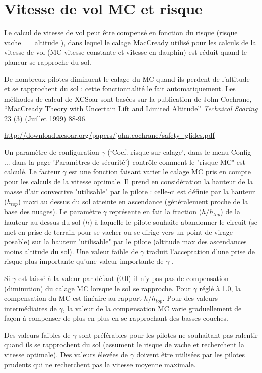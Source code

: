 \section{Vitesse de vol MC et risque}\label{sec:speed-fly-with}
Le calcul de vitesse de vol peut être compensé en fonction du risque (risque ~= vache  ~= altitude ), dans lequel le calage MacCready utilisé pour les calculs de la vitesse de vol (MC vitesse constante et vitesse en dauphin) est réduit quand le planeur se rapproche du sol.

De nombreux pilotes diminuent le calage du MC quand ils perdent de l'altitude et se rapprochent du sol : cette fonctionnalité le fait automatiquement. Les méthodes de calcul de XCSoar sont basées sur la publication de John  Cochrane, ``MacCready Theory with Uncertain Lift and Limited  Altitude'' {\em Technical Soaring} 23 (3) (Juillet 1999) 88-96.

\url{http://download.xcsoar.org/papers/john.cochrane/safety_glides.pdf}

Un paramètre de configuration $\gamma$ (`Coef. risque sur calage', dans le menu Config ... dans la page 'Paramètres de sécurité')  contrôle comment le "risque MC" est calculé. Le facteur $\gamma$ est une fonction faisant varier le calage MC pris en compte pour les calculs de la vitesse optimale. Il prend en considération la hauteur de la masse d'air convective "utilisable" par le pilote : celle-ci est définie par la hauteur ($h_{top}$) maxi au dessus du sol atteinte en ascendance (généralement proche de la base des nuages). Le paramètre $\gamma$ représente en fait la fraction ($h/h_{top}$) de la hauteur au dessus du sol  ($h$) à laquelle le pilote souhaite abandonner le circuit (se met en prise de terrain pour se vacher ou se dirige vers un point de virage posable) sur la hauteur "utilisable" par le pilote (altitude max des ascendances moins altitude du sol). Une valeur faible de $\gamma$  traduit l'acceptation d'une prise de risque plus importante qu'une valeur importante de  $\gamma$ . 

Si  $\gamma$  est laissé à la valeur par défaut (0.0) il n'y pas pas de compensation (diminution) du calage MC lorsque le sol se rapproche. Pour  $\gamma$  réglé à 1.0, la compensation du MC est linéaire au rapport   $h/h_{top}$. Pour des valeurs intermédiaires de  $\gamma$, la valeur de la compensation MC varie graduellement de façon à compenser de plus en plus en se rapprochant des basses couches.

Des valeurs faibles de  $\gamma$  sont préférables pour les pilotes ne souhaitant pas ralentir quand ils se rapprochent du sol (assument le risque de vache et recherchent la vitesse optimale). Des valeurs élevées de  $\gamma$  doivent être utilisées par les pilotes prudents qui ne recherchent pas la vitesse moyenne maximale.

